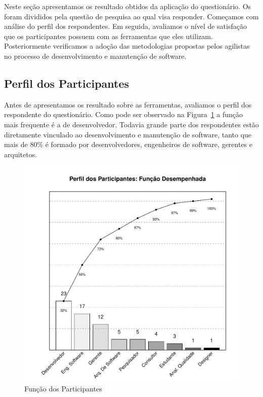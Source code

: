 Neste seção apresentamos os resultado obtidos da aplicação do questionário. Os
foram divididos pela questão de pesquisa ao qual visa responder. Começamos com
análise do perfil dos respondentes. Em seguida, avaliamos o nível de satisfação
que os participantes possuem com as ferramentas que eles utilizam.
Posteriormente verificamos a adoção das metodologias propostas pelos agilistas
no processo de desenvolvimento e manutenção de software. 

\subsection{Perfil dos Participantes}
\label{sub:pesquisa_prof_perfil_dos_participantes}

Antes de apresentamos os resultado sobre as ferramentas, avaliamos o perfil dos
respondente do questionário. Como pode ser observado na
Figura~\ref{fig:grafico_melhorias_fgrm_funcao_particantes} a função mais
frequente é a de desenvolvedor. Todavia grande parte dos respondentes estão
diretamente vinculado ao desenvolvimento e manutenção de software, tanto que
mais de 80\% é formado por desenvolvedores, engenheiros de software, gerentes e
arquitetos. 

\begin{figure}[htpb]
	\centering
	\includegraphics[width=0.8\linewidth]{./chapter-pesquisa-com-profissionais/img/grafico_melhoria_fgrm_funcao_participantes.pdf}
	\caption{Função dos Participantes}
\label{fig:grafico_melhorias_fgrm_funcao_particantes}
\end{figure}

